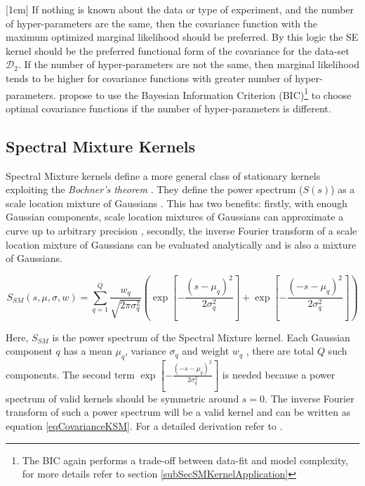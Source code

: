 [1cm]
If nothing is known about the data or type of experiment, and the number of hyper-parameters are the same, then the covariance function with the maximum optimized marginal likelihood should be preferred. By this logic the SE kernel should be the preferred functional form of the covariance for the data-set $\mathcal{D}_{2}$. If the number of hyper-parameters are not the same, then marginal likelihood tends to be higher for covariance functions with greater number of hyper-parameters. \cite{duvenaud-thesis-2014, lloyd2014automatic} propose to use the Bayesian Information Criterion (BIC)\footnote{The BIC again performs a trade-off between data-fit and model complexity, for more details refer to section \ref{subSecSMKernelApplication}} to choose optimal covariance functions if the number of hyper-parameters is different. 

\subsection{Spectral Mixture Kernels}\label{subSecSMKernel}
Spectral Mixture kernels define a more general class of stationary kernels exploiting the \textit{Bochner's theorem} \cite{bochner1959lectures}. They define the power spectrum ($S(s)$) as a scale location mixture of Gaussians \cite{wilson2013gaussian}. This has two benefits: firstly, with enough Gaussian components, scale location mixtures of Gaussians can approximate a curve up to arbitrary precision \cite{kostantinos2000gaussian, bishop2006pattern}, secondly, the inverse Fourier transform of a scale location mixture of Gaussians can be evaluated analytically and is also a mixture of Gaussians.

\begin{equation}\label{eqPowerSpectrumSSM}
    S_{SM}(s, \mu, \sigma, w) = \sum_{q=1}^{Q} \frac{w_{q}}{\sqrt{2\pi\sigma_{q}^2}}
\left ( \exp\left [ {-\frac{{(s-\mu_{q})^2}}{2\sigma_{q}^{2}}} \right ] + \exp\left [ {-\frac{{(-s-\mu_{q})^2}}{2\sigma_{q}^{2}}} \right ] \right  )
\end{equation}

Here, $ S_{SM}$ is the power spectrum of the Spectral Mixture kernel. Each Gaussian  component $q$ has a mean $\mu_{q}$, variance $\sigma_{q}$ and weight $w_{q}$ , there are total $Q$ such components. The second term $\exp\left [ {-\frac{{(-s-\mu_{q})^2}}{2\sigma_{q}^{2}}} \right ]$ is needed because a power spectrum of valid kernels should be symmetric around $s=0$. The inverse Fourier transform of such a power spectrum will be a valid kernel and can be written as equation \ref{eqCovarianceKSM}. For a detailed derivation refer to \cite{wilson2014thesis}.

